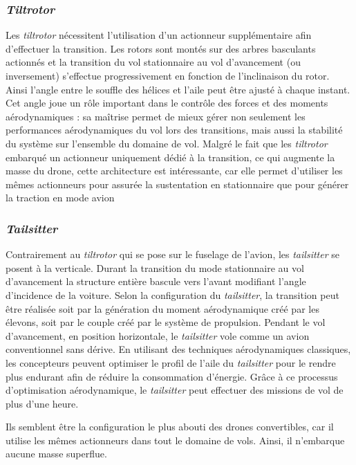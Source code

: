        \subsubsection*{\textit{Tiltrotor}}

        Les \textit{tiltrotor} nécessitent l'utilisation d'un actionneur supplémentaire afin d'effectuer la transition. Les rotors sont montés sur des arbres basculants actionnés et la transition du vol stationnaire au vol d'avancement (ou inversement) s'effectue progressivement en fonction de l'inclinaison du rotor. Ainsi l'angle entre le souffle des hélices et l'aile peut être ajusté à chaque instant. Cet angle joue un rôle important dans le contrôle des forces et des moments aérodynamiques : sa maîtrise permet de mieux gérer non seulement les performances aérodynamiques du vol lors des transitions, mais aussi la stabilité du système sur l'ensemble du domaine de vol. 
        Malgré le fait que les \textit{tiltrotor} embarqué un actionneur uniquement dédié à la transition, ce qui augmente la masse du drone, cette architecture est intéressante, car elle permet d'utiliser les mêmes actionneurs pour assurée la sustentation en stationnaire que pour générer la traction en mode avion

        \subsubsection*{\textit{Tailsitter}}
        Contrairement au \textit{tiltrotor} qui se pose sur le fuselage de l'avion, les \textit{tailsitter} se posent à la verticale. Durant la transition du mode stationnaire au vol d'avancement la structure entière bascule vers l'avant modifiant l'angle d'incidence de la voiture. Selon la configuration du \textit{tailsitter}, la transition peut être réalisée soit par la génération du moment aérodynamique créé par les élevons, soit par le couple créé par le système de propulsion. Pendant le vol d'avancement, en position horizontale, le \textit{tailsitter} vole comme un avion conventionnel sans dérive. En utilisant des techniques aérodynamiques classiques, les concepteurs peuvent optimiser le profil de l'aile du \textit{tailsitter} pour le rendre plus endurant afin de réduire la consommation d'énergie. Grâce à ce processus d'optimisation aérodynamique, le \textit{tailsitter} peut effectuer des missions de vol de plus d'une heure.
        
        Ils semblent être la configuration le plus abouti des drones convertibles, car il utilise les mêmes actionneurs dans tout le domaine de vols. Ainsi, il n'embarque aucune masse superflue.


